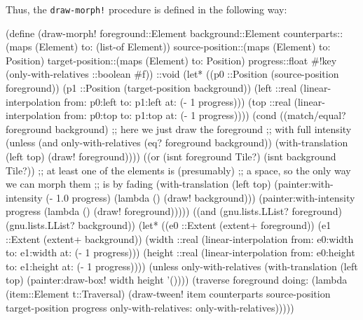 \documentclass[acmsmall]{acmart}
\newenvironment{Snippet}{\Verbatim[samepage=true]}{\endVerbatim}
\begin{document}
Thus, the \texttt{draw-morph!} procedure is defined in the following way:

\begin{Snippet}
(define (draw-morph! foreground::Element background::Element
		     counterparts::(maps (Element) to: (list-of Element))
		     source-position::(maps (Element) to: Position)
		     target-position::(maps (Element) to: Position)
		     progress::float
		     #!key (only-with-relatives ::boolean #f))
  ::void
\end{Snippet}
\begin{Snippet}
  (let* ((p0 ::Position (source-position foreground))
	 (p1 ::Position (target-position background))
	 (left ::real (linear-interpolation from: p0:left to: p1:left
		                            at: (- 1 progress)))
	 (top ::real (linear-interpolation from: p0:top to: p1:top
		                           at: (- 1 progress))))
\end{Snippet}
\begin{Snippet}
    (cond
     ((match/equal? foreground background)
      ;; here we just draw the foreground
      ;; with full intensity
      (unless (and only-with-relatives (eq? foreground background))
	(with-translation (left top)
	  (draw! foreground))))
\end{Snippet}
\begin{Snippet}
     ((or (isnt foreground Tile?)
	  (isnt background Tile?))
      ;; at least one of the elements is (presumably)
      ;; a space, so the only way we can morph them
      ;; is by fading
      (with-translation (left top)
	(painter:with-intensity (- 1.0 progress)
	  (lambda ()
	    (draw! background)))
	(painter:with-intensity progress
	  (lambda ()
	    (draw! foreground)))))
\end{Snippet}
\begin{Snippet}
     ((and (gnu.lists.LList? foreground)
	   (gnu.lists.LList? background))
      (let* ((e0 ::Extent (extent+ foreground))
	     (e1 ::Extent (extent+ background))
	     (width ::real (linear-interpolation from: e0:width to: e1:width
						 at: (- 1 progress)))
	     (height ::real (linear-interpolation from: e0:height to: e1:height
						  at: (- 1 progress))))
\end{Snippet}
\begin{Snippet}
	(unless only-with-relatives
	  (with-translation (left top)
	    (painter:draw-box! width height '())))
\end{Snippet}
\begin{Snippet}
	(traverse
	 foreground
	 doing:
	 (lambda (item::Element t::Traversal)
	   (draw-tween! item counterparts source-position target-position
			progress only-with-relatives: only-with-relatives)))))
\end{Snippet}
\end{document}
